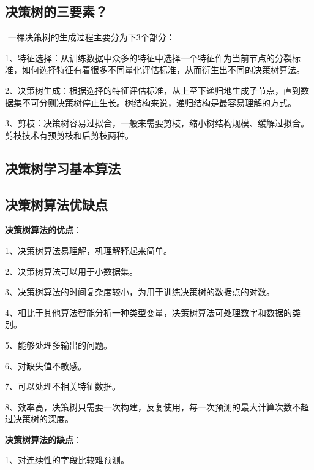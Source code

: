 \subsection{决策树的三要素？}\label{ux51b3ux7b56ux6811ux7684ux4e09ux8981ux7d20}

​ 一棵决策树的生成过程主要分为下3个部分：

​
1、特征选择：从训练数据中众多的特征中选择一个特征作为当前节点的分裂标准，如何选择特征有着很多不同量化评估标准，从而衍生出不同的决策树算法。

​
2、决策树生成：根据选择的特征评估标准，从上至下递归地生成子节点，直到数据集不可分则决策树停止生长。树结构来说，递归结构是最容易理解的方式。

​
3、剪枝：决策树容易过拟合，一般来需要剪枝，缩小树结构规模、缓解过拟合。剪枝技术有预剪枝和后剪枝两种。

\subsection{决策树学习基本算法}\label{ux51b3ux7b56ux6811ux5b66ux4e60ux57faux672cux7b97ux6cd5}

 

\subsection{决策树算法优缺点}\label{ux51b3ux7b56ux6811ux7b97ux6cd5ux4f18ux7f3aux70b9}

\textbf{决策树算法的优点}：

1、决策树算法易理解，机理解释起来简单。

2、决策树算法可以用于小数据集。

3、决策树算法的时间复杂度较小，为用于训练决策树的数据点的对数。

4、相比于其他算法智能分析一种类型变量，决策树算法可处理数字和数据的类别。

5、能够处理多输出的问题。

6、对缺失值不敏感。

7、可以处理不相关特征数据。

8、效率高，决策树只需要一次构建，反复使用，每一次预测的最大计算次数不超过决策树的深度。

\textbf{决策树算法的缺点}：

1、对连续性的字段比较难预测。

